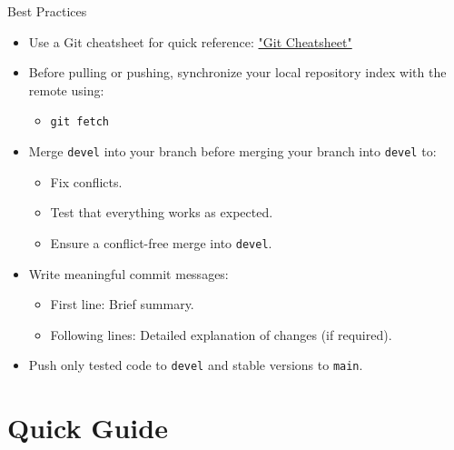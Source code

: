 \begin{frame}{Best Practices}
  \begin{itemize}
    \item Use a Git cheatsheet for quick reference: \href{https://ndpsoftware.com/git-cheatsheet.html}{"Git Cheatsheet"}
    \item Before pulling or pushing, synchronize your local repository index with the remote using:
      \begin{itemize}
        \item \texttt{git fetch}
      \end{itemize}
    \item Merge \texttt{devel} into your branch before merging your branch into \texttt{devel} to:
      \begin{itemize}
        \item Fix conflicts.
        \item Test that everything works as expected.
        \item Ensure a conflict-free merge into \texttt{devel}.
      \end{itemize}
    \item Write meaningful commit messages:
      \begin{itemize}
        \item First line: Brief summary.
        \item Following lines: Detailed explanation of changes (if required).
      \end{itemize}
    \item Push only tested code to \texttt{devel} and stable versions to \texttt{main}.
  \end{itemize}
\end{frame}

\section{Quick Guide}

